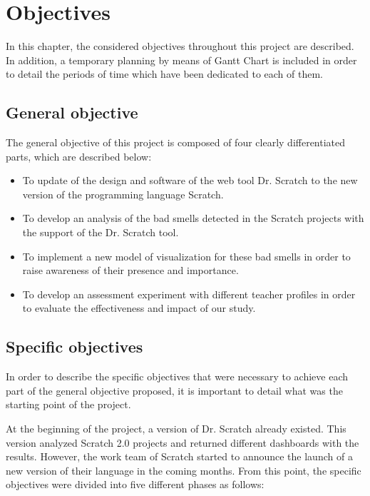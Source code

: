 

\chapter{Objectives} 
\label{chap:objectives} 

In this chapter, the considered objectives throughout this project are described. In addition, a temporary planning by means of Gantt Chart is included in order to detail the periods of time which have been dedicated to each of them.

\section{General objective}
\label{sec:general-objective}

The general objective of this project is composed of four clearly differentiated parts, which are described below:

\begin{itemize}
    \item To update of the design and software of the web tool Dr. Scratch to the new version of the programming language Scratch. 
    \item To develop an analysis of the bad smells detected in the Scratch projects with the support of the Dr. Scratch tool. 
    \item To implement a new model of visualization for these bad smells in order to raise awareness of their presence and importance. 
    \item To develop an assessment experiment with different teacher profiles in order to evaluate the effectiveness and impact of our study.
\end{itemize}


\section{Specific objectives}
\label{sec:specific-objectives}

In order to describe the specific objectives that were necessary to achieve each part of the general objective proposed, it is important to detail what was the starting point of the project. 

At the beginning of the project, a version of Dr. Scratch already existed. This version analyzed Scratch 2.0 projects and returned different dashboards with the results. However, the work team of Scratch started to announce the launch of a new version of their language in the coming months. From this point, the specific objectives were divided into five different phases as follows:

